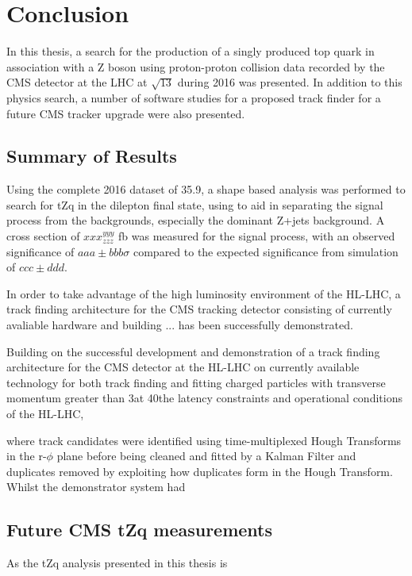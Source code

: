 \chapter{Conclusion}\label{chapter:conclusion}
In this thesis, a search for the production of a singly produced top quark in association with a Z boson using proton-proton collision data recorded by the CMS detector at the LHC at $\sqrt{13}$ during 2016 was presented.
In addition to this physics search, a number of software studies for a proposed track finder for a future CMS tracker upgrade were also presented.

\section{Summary of Results}
Using the complete 2016 dataset of 35.9\fbinv, a shape based analysis was performed to search for tZq in the dilepton final state, using  to aid in separating the signal process from the backgrounds, especially the dominant Z+jets background.
A cross section of $xxx^{yyy}_{zzz}$ fb was measured for the signal process, with an observed significance of $aaa \pm bbb \sigma$ compared to the expected significance from simulation of $ccc \pm ddd$. 



In order to take advantage of the high luminosity environment of the HL-LHC, a track finding architecture for the CMS tracking detector consisting of currently avaliable hardware and building ... has been successfully demonstrated.


Building on the successful development and demonstration of a track finding architecture for the CMS detector at the HL-LHC on currently available technology for both track finding and fitting charged particles with transverse momentum greater than 3\GeV at 40\MHz the latency constraints and operational conditions of the HL-LHC, 


where track candidates were identified using time-multiplexed Hough Transforms in the r-$\phi$ plane before being cleaned and fitted by a Kalman Filter and duplicates removed by exploiting how duplicates form in the Hough Transform. 
Whilst the demonstrator system had 

\section{Future CMS tZq measurements}
As the tZq analysis presented in this thesis is 

